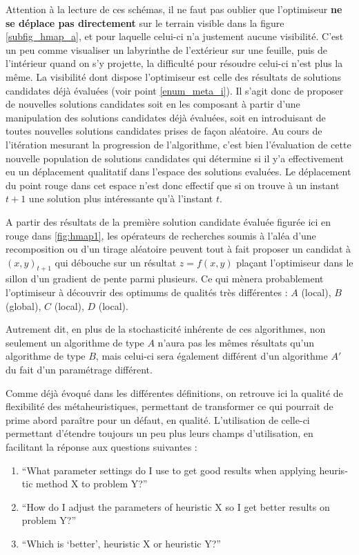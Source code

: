 Attention à la lecture de ces schémas, il ne faut pas oublier que l'optimiseur \textbf{ne se déplace pas directement} sur le terrain visible dans la figure \ref{subfig_hmap_a}, et pour laquelle celui-ci n'a justement aucune visibilité. C'est un peu comme visualiser un labyrinthe de l'extérieur sur une feuille, puis de l'intérieur quand on s'y projette, la difficulté pour résoudre celui-ci n'est plus la même. La visibilité dont dispose l'optimiseur est celle des résultats de solutions candidates déjà évaluées (voir point \ref{enum_meta_i}). Il s'agit donc de proposer de nouvelles solutions candidates soit en les composant à partir d'une manipulation des solutions candidates déjà évaluées, soit en introduisant de toutes nouvelles solutions candidates prises de façon aléatoire. Au cours de l'itération mesurant la progression de l'algorithme, c'est bien l'évaluation de cette nouvelle population de solutions candidates qui détermine si il y'a effectivement eu un déplacement qualitatif dans l'espace des solutions evaluées. Le déplacement du point rouge dans cet espace n'est donc effectif que si on trouve à un instant $t + 1$ une solution plus intéressante qu'à l'instant $t$.

A partir des résultats de la première solution candidate évaluée figurée ici en rouge dans \ref{fig:hmap1}, les opérateurs de recherches soumis à l'aléa d'une recomposition ou d'un tirage aléatoire peuvent tout à fait proposer un candidat à $(x,y)_{t+1}$ qui débouche sur un résultat $z = f(x,y)$ plaçant l'optimiseur dans le sillon d'un gradient de pente parmi plusieurs. Ce qui mènera probablement l'optimiseur à découvrir des optimums de qualités très différentes : $A$ (local), $B$ (global), $C$ (local), $D$ (local).

Autrement dit, en plus de la stochasticité inhérente de ces algorithmes, non seulement un algorithme de type $A$ n'aura pas les mêmes résultats qu'un algorithme de type $B$, mais celui-ci sera également différent d'un algorithme $A'$ du fait d'un paramétrage différent.

Comme déjà évoqué dans les différentes définitions, on retrouve ici la qualité de flexibilité des métaheuristiques, permettant de transformer ce qui pourrait de prime abord paraître pour un défaut, en qualité. L'utilisation de celle-ci permettant d'étendre toujours un peu plus leurs champs d'utilisation, en facilitant la réponse aux questions suivantes  :
\begin{enumerate}
\item  \foreignquote{english}{What parameter settings do I use to get good results when applying heuristic method X to problem Y?}
\item  \foreignquote{english}{How do I adjust the parameters of heuristic X so I get better results on problem Y?}
\item \foreignquote{english}{Which is \enquote{better}, heuristic X or heuristic Y?}
\end{enumerate}

